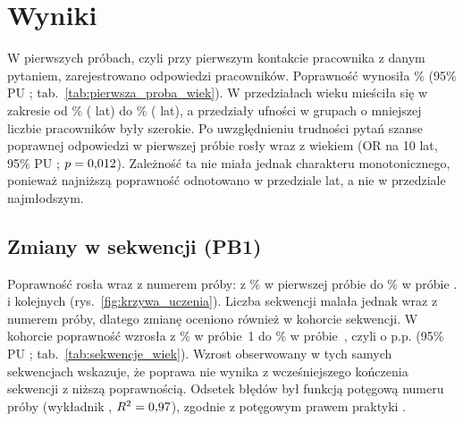 \section{Wyniki}

W pierwszych próbach, czyli przy pierwszym kontakcie pracownika z danym pytaniem, zarejestrowano
\FirstN{} odpowiedzi \NEmployees{} pracowników. Poprawność wynosiła \FirstAcc\% (95\% PU
\FirstAccCI; tab.~\ref{tab:pierwsza_proba_wiek}). W przedziałach wieku mieściła się w zakresie od
\FirstAccMin\% (\FirstAccMinGroup{} lat) do \FirstAccMax\% (\FirstAccMaxGroup{} lat), a przedziały
ufności w grupach o mniejszej liczbie pracowników były szerokie. Po uwzględnieniu trudności pytań
szanse poprawnej odpowiedzi w pierwszej próbie rosły wraz z wiekiem (OR \FirstAgeOR{} na 10 lat,
95\% PU \FirstAgeORCI; $p = 0{,}012$). Zależność ta nie miała jednak charakteru monotonicznego,
ponieważ najniższą poprawność odnotowano w przedziale \FirstAccMinGroup{} lat, a nie w przedziale
najmłodszym. %

\begin{table}[H]
\centering
\caption{Poprawność w pierwszej próbie ogółem i według przedziału wieku pracownika.}
\label{tab:pierwsza_proba_wiek}
\footnotesize
\setlength{\tabcolsep}{4pt}
\end{table}

\subsection{Zmiany w sekwencji (PB1)}
Poprawność rosła wraz z numerem próby: z \AccAttOne\% \AccAttOneCI{} w pierwszej próbie do
\AccAttMax\% \AccAttMaxCI{} w próbie \AttMax{}. i kolejnych (rys.~\ref{fig:krzywa_uczenia}).
Liczba sekwencji malała jednak wraz z numerem próby, dlatego zmianę
oceniono również w kohorcie \CohortN{} sekwencji. W kohorcie poprawność wzrosła z \CohortAccOne\%
\CohortAccOneCI{} w próbie~1 do \CohortAccK\% \CohortAccKCI{} w próbie~\CohortK{}, czyli
o \SeqChange{} p.p. (95\% PU \SeqChangeCI; tab.~\ref{tab:sekwencje_wiek}). Wzrost obserwowany w tych
samych sekwencjach wskazuje, że poprawa nie wynika z wcześniejszego kończenia sekwencji z niższą
poprawnością. Odsetek błędów był funkcją potęgową numeru próby (wykładnik \PowerLawB,
$R^2 = 0{,}97$), zgodnie z potęgowym prawem praktyki \citep{newell1981}.


